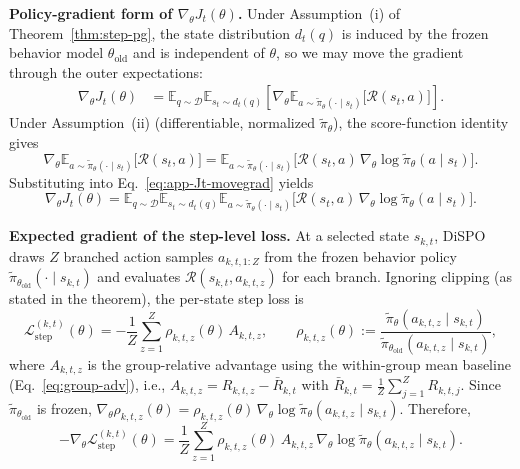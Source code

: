 \documentclass{article}
\theoremstyle{plain}
\theoremstyle{definition}
\theoremstyle{remark}
\begin{document}
\textbf{Policy-gradient form of $\nabla_\theta J_t(\theta)$.}
Under Assumption~(i) of Theorem~\ref{thm:step-pg}, the state distribution
$d_t(q)$ is induced by the frozen behavior model $\theta_{\text{old}}$ and
is independent of $\theta$, so we may move the gradient through the outer
expectations:
\begin{align}
\nabla_\theta J_t(\theta)
&=
\mathbb{E}_{q \sim \mathcal{D}}
\mathbb{E}_{s_t \sim d_t(q)}
\left[
\nabla_\theta
\mathbb{E}_{a \sim \tilde{\pi}_\theta(\cdot \mid s_t)}
\bigl[\mathcal{R}(s_t,a)\bigr]
\right].
\label{eq:app-Jt-movegrad}
\end{align}
Under Assumption~(ii) (differentiable, normalized $\tilde{\pi}_\theta$), the
score-function identity gives
\[
\nabla_\theta
\mathbb{E}_{a \sim \tilde{\pi}_\theta(\cdot \mid s_t)}
\bigl[\mathcal{R}(s_t,a)\bigr]
=
\mathbb{E}_{a \sim \tilde{\pi}_\theta(\cdot \mid s_t)}
\bigl[\mathcal{R}(s_t,a)\,\nabla_\theta \log \tilde{\pi}_\theta(a \mid s_t)\bigr].
\]
Substituting into Eq.~\ref{eq:app-Jt-movegrad} yields
\begin{equation}
\nabla_\theta J_t(\theta)
=
\mathbb{E}_{q \sim \mathcal{D}}
\mathbb{E}_{s_t \sim d_t(q)}
\mathbb{E}_{a \sim \tilde{\pi}_\theta(\cdot \mid s_t)}
\bigl[\mathcal{R}(s_t,a)\,\nabla_\theta \log \tilde{\pi}_\theta(a \mid s_t)\bigr].
\label{eq:app-Jt-pg}
\end{equation}

\textbf{Expected gradient of the step-level loss.}
At a selected state $s_{k,t}$, DiSPO draws $Z$ branched action samples
$a_{k,t,1:Z}$ from the frozen behavior policy $\tilde{\pi}_{\theta_{\text{old}}}(\cdot\mid s_{k,t})$
and evaluates $\mathcal{R}(s_{k,t},a_{k,t,z})$ for each branch.
Ignoring clipping (as stated in the theorem), the per-state step loss is
\[
  \mathcal{L}_{\text{step}}^{(k,t)}(\theta)
  =
  -\frac{1}{Z}\sum_{z=1}^Z
  \rho_{k,t,z}(\theta)\,A_{k,t,z},
  \qquad
  \rho_{k,t,z}(\theta)
  :=
  \frac{\tilde{\pi}_\theta(a_{k,t,z}\mid s_{k,t})}{\tilde{\pi}_{\theta_{\text{old}}}(a_{k,t,z}\mid s_{k,t})},
\]
where $A_{k,t,z}$ is the group-relative advantage using the within-group mean baseline (Eq.~\ref{eq:group-adv}), i.e., $A_{k,t,z}=R_{k,t,z}-\bar R_{k,t}$ with $\bar R_{k,t}=\frac{1}{Z}\sum_{j=1}^Z R_{k,t,j}$.
Since $\tilde{\pi}_{\theta_{\text{old}}}$ is frozen, $\nabla_\theta \rho_{k,t,z}(\theta)
=
\rho_{k,t,z}(\theta)\,\nabla_\theta \log \tilde{\pi}_\theta(a_{k,t,z}\mid s_{k,t})$.
Therefore,
\begin{equation}
-\nabla_\theta \mathcal{L}_{\text{step}}^{(k,t)}(\theta)
=
\frac{1}{Z}\sum_{z=1}^Z
\rho_{k,t,z}(\theta)\,A_{k,t,z}\,\nabla_\theta \log \tilde{\pi}_\theta(a_{k,t,z}\mid s_{k,t}).
\label{eq:app-step-grad}
\end{equation}
\end{document}
